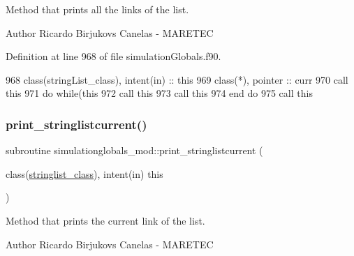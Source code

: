 Method that prints all the links of the list. 

\begin{DoxyAuthor}{Author}
Ricardo Birjukovs Canelas -\/ M\+A\+R\+E\+T\+EC 
\end{DoxyAuthor}


Definition at line 968 of file simulation\+Globals.\+f90.


\begin{DoxyCode}
968     \textcolor{keywordtype}{class}(stringList\_class), \textcolor{keywordtype}{intent(in)} :: this
969     \textcolor{keywordtype}{class}(*), \textcolor{keywordtype}{pointer} :: curr
970     \textcolor{keyword}{call }this%
971     \textcolor{keywordflow}{do} \textcolor{keywordflow}{while}(this%
972         \textcolor{keyword}{call }this%
973         \textcolor{keyword}{call }this%
974 \textcolor{keywordflow}{    end do}
975     \textcolor{keyword}{call }this%
\end{DoxyCode}
\mbox{\label{namespacesimulationglobals__mod_a405f70548e38f0af65d4cbdb7c7025a4}} 
\subsubsection{\texorpdfstring{print\+\_\+stringlistcurrent()}{print\_stringlistcurrent()}}
{\footnotesize\ttfamily subroutine simulationglobals\+\_\+mod\+::print\+\_\+stringlistcurrent (\begin{DoxyParamCaption}\item[{class(\mbox{\hyperlink{structsimulationglobals__mod_1_1stringlist__class}{stringlist\+\_\+class}}), intent(in)}]{this }\end{DoxyParamCaption})\hspace{0.3cm}{\ttfamily [private]}}



Method that prints the current link of the list. 

\begin{DoxyAuthor}{Author}
Ricardo Birjukovs Canelas -\/ M\+A\+R\+E\+T\+EC 
\end{DoxyAuthor}


